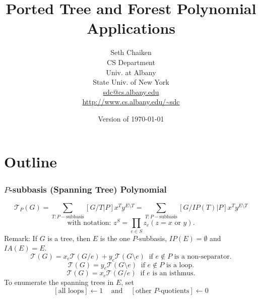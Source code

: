 \documentclass{beamer}
\title{Ported Tree and Forest Polynomial Applications}
\author{Seth Chaiken\\
CS Department\\
Univ. at Albany\\
State Univ. of New York\\
\url{sdc@cs.albany.edu}\\
\url{http://www.cs.albany.edu/~sdc}
}
\date{Version of \today}
\begin{document}
\newcommand{\Remph}[1]{{\color{red}#1}}

\newcommand{\dunion}
{\mbox{\hbox{\hskip6pt$\cdot$\hskip-5.50pt$\cup$\hskip2pt}}}
%

\newcommand{\en}{\;\raisebox{-0.2\height}{}}
\newcommand{\ez}{\;\;\raisebox{-0.2\height}{}}

\newcommand{\pn}{\;\raisebox{-0.2\height}{}}
\newcommand{\qn}{\;\raisebox{-0.2\height}{}}
\newcommand{\pz}{\;\;\raisebox{-0.2\height}{}}
\newcommand{\qz}{\;\;\raisebox{-0.2\height}{}}
\newcommand{\pzqz}{\;\raisebox{-0.2\height}{}}
\newcommand{\pzqn}{\;\raisebox{-0.2\height}{}}
\newcommand{\pnqz}{\;\raisebox{-0.2\height}{}}
\newcommand{\pnqn}{\;\raisebox{-0.2\height}{}}
\newcommand{\pqegg}{\;\raisebox{-0.2\height}{}}

\newcommand{\pnsub}{}
\newcommand{\qnsub}{}
\newcommand{\pzsub}{}
\newcommand{\qzsub}{}
\newcommand{\pzqzsub}{}
\newcommand{\pzqnsub}{}
\newcommand{\pnqzsub}{}
\newcommand{\pnqnsub}{}
\newcommand{\pqeggsub}{}




\begin{frame}
\titlepage
\end{frame}
\section*{Outline}
\begin{frame}
\tableofcontents
\end{frame}






\begin{frame}
\frametitle{$P$-subbasis (Spanning Tree) Polynomial}
\[
\mathcal{T}_P(G)=\sum_{T:P-\text{subbasis}}
[G/T|P]x^Ty^{E\setminus T}
=
\sum_{T:P-\text{subbasis}}
[G/IP(T)|P]x^Ty^{E\setminus T}
\]
\[
\text{with notation: } z^S=\prod_{e\in S}z_e (z = x \text{ or } y).
\]
Remark: If $G$ is a tree, then $E$ is the one 
$P$-subbasis, $IP(E)=\emptyset$ and  $IA(E)=E$.
\[
\mathcal{T}(G)=x_e\mathcal{T}(G/e)+y_e\mathcal{T}(G\setminus e)
\;\;\text{if $e\not\in P$ is a non-separator.}
\]
\[
\mathcal{T}(G)=y_e\mathcal{T}(G\setminus e)
\;\;\text{if $e\not\in P$ is a loop.}
\]
\[
\mathcal{T}(G)=x_e\mathcal{T}(G/ e)\;\;\text{if $e$ is an isthmus.}
\]
To enumerate the spanning trees in $E$, set
\[
[\text{all loops}]\leftarrow 1\;\;\;\text{ and }\;\;\;
[\text{other $P$-quotients}]\leftarrow 0
\]
\end{frame}
\end{document}
